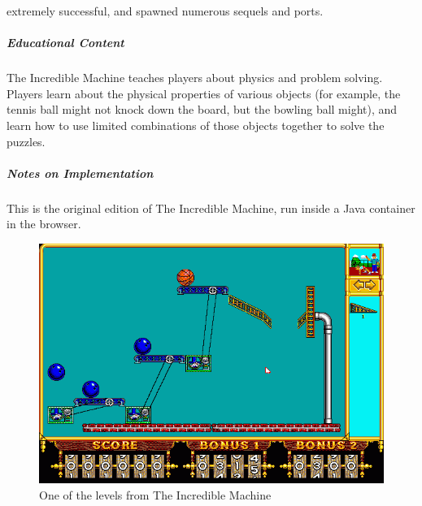extremely successful, and spawned numerous sequels and ports.\subparagraph{Educational Content}The Incredible Machine teaches players about physics and problem solving. Players learn about the physical properties of various objects (for example, the tennis ball might not knock down the board, but the bowling ball might), and learn how to use limited combinations of those objects together to solve the puzzles. \subparagraph{Notes on Implementation}This is the original edition of The Incredible Machine, run inside a Java container in the browser.\begin{figure}[p]\centering \includegraphics[height=.4\textheight, width=\textwidth, keepaspectratio=true]{img/machine_screen.png}\caption{One of the levels from The Incredible Machine}\end{figure}